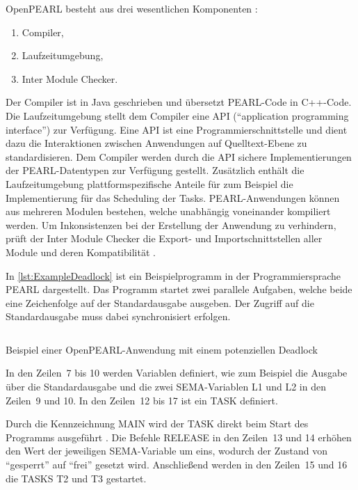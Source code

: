 OpenPEARL besteht aus drei wesentlichen Komponenten
\autocite{OpenPEARL_Structure}:
\begin{enumerate}
  \item Compiler,
  \item Laufzeitumgebung,
  \item Inter Module Checker.
\end{enumerate}
Der Compiler ist in Java geschrieben und übersetzt PEARL-Code in C++-Code. Die
Laufzeitumgebung stellt dem Compiler eine API ("`application programming
interface"') zur Verfügung. Eine API ist eine Programmierschnittstelle und dient
dazu die Interaktionen zwischen Anwendungen auf Quelltext-Ebene zu
standardisieren. Dem Compiler werden durch die API sichere Implementierungen der
PEARL-Datentypen zur Verfügung gestellt. Zusätzlich enthält die Laufzeitumgebung
plattformspezifische Anteile für zum Beispiel die Implementierung für das
Scheduling der Tasks. PEARL-Anwendungen können aus mehreren Modulen bestehen,
welche unabhängig voneinander kompiliert werden. Um Inkonsistenzen bei der
Erstellung der Anwendung zu verhindern, prüft der Inter Module Checker die
Export- und Importschnittstellen aller Module und deren Kompatibilität
\autocite{OpenPEARL_Structure}.

In \cref{lst:ExampleDeadlock} ist ein Beispielprogramm in der Programmiersprache
PEARL dargestellt. Das Programm startet zwei parallele Aufgaben, welche beide
eine Zeichenfolge auf der Standardausgabe ausgeben. Der Zugriff auf die
Standardausgabe muss dabei synchronisiert erfolgen.
\begin{listing}[ht]
  \inputminted[frame=lines,linenos]{vim}{./Examples/Example_Deadlock.prl}
  \caption{Beispiel einer OpenPEARL-Anwendung mit einem potenziellen Deadlock}
  \label{lst:ExampleDeadlock}   
\end{listing} 
In den Zeilen~7 bis 10 werden Variablen definiert, wie zum Beispiel die Ausgabe
über die Standardausgabe und die zwei \textrm{SEMA}-Variablen \textrm{L1} und
\textrm{L2} in den Zeilen~9 und 10. In den Zeilen~12 bis 17 ist ein \textrm{TASK}
definiert.

Durch die Kennzeichnung \textrm{MAIN} wird der \textrm{TASK} direkt beim Start
des Programms ausgeführt \autocite[vgl.][28]{PEARL}. Die Befehle
\textrm{RELEASE} in den Zeilen~13 und 14 erhöhen den Wert der jeweiligen
\textrm{SEMA}-Variable um eins, wodurch der Zustand von "`gesperrt"' auf
"`frei"' gesetzt wird. Anschließend werden in den Zeilen~15 und 16 die
\textrm{TASKS} \textrm{T2} und \textrm{T3} gestartet.

